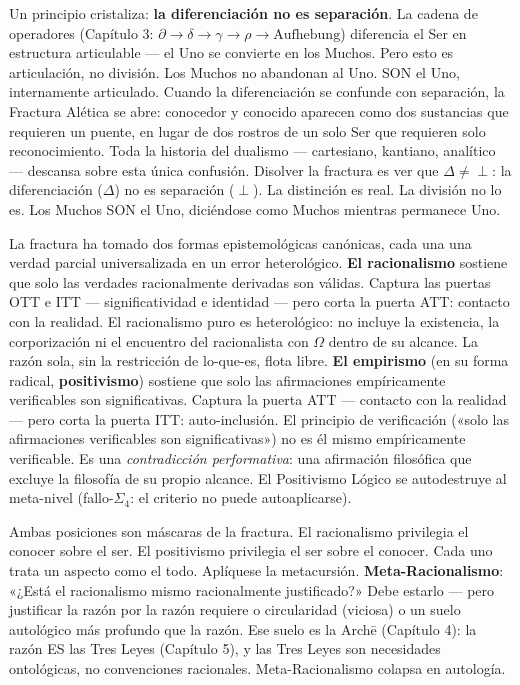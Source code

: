 \documentclass[10pt, openany, oneside]{book}
\begin{document}
Un principio cristaliza: \textbf{la diferenciación no es separación}. La cadena de operadores (Capítulo 3: $\partial \to \delta \to \gamma \to \rho \to \text{Aufhebung}$) diferencia el Ser en estructura articulable --- el Uno se convierte en los Muchos. Pero esto es articulación, no división. Los Muchos no abandonan al Uno. SON el Uno, internamente articulado. Cuando la diferenciación se confunde con separación, la Fractura Alética se abre: conocedor y conocido aparecen como dos sustancias que requieren un puente, en lugar de dos rostros de un solo Ser que requieren solo reconocimiento. Toda la historia del dualismo --- cartesiano, kantiano, analítico --- descansa sobre esta única confusión. Disolver la fractura es ver que $\Delta \neq \perp$: la diferenciación ($\Delta$) no es separación ($\perp$). La distinción es real. La división no lo es. Los Muchos SON el Uno, diciéndose como Muchos mientras permanece Uno.

La fractura ha tomado dos formas epistemológicas canónicas, cada una una verdad parcial universalizada en un error heterológico. \textbf{El racionalismo} sostiene que solo las verdades racionalmente derivadas son válidas. Captura las puertas OTT e ITT --- significatividad e identidad --- pero corta la puerta ATT: contacto con la realidad. El racionalismo puro es heterológico: no incluye la existencia, la corporización ni el encuentro del racionalista con $\Omega$ dentro de su alcance. La razón sola, sin la restricción de lo-que-es, flota libre. \textbf{El empirismo} (en su forma radical, \textbf{positivismo}) sostiene que solo las afirmaciones empíricamente verificables son significativas. Captura la puerta ATT --- contacto con la realidad --- pero corta la puerta ITT: auto-inclusión. El principio de verificación («solo las afirmaciones verificables son significativas») no es él mismo empíricamente verificable. Es una \textit{contradicción performativa}: una afirmación filosófica que excluye la filosofía de su propio alcance. El Positivismo Lógico se autodestruye al meta-nivel (fallo-$\Sigma_4$: el criterio no puede autoaplicarse).

Ambas posiciones son máscaras de la fractura. El racionalismo privilegia el conocer sobre el ser. El positivismo privilegia el ser sobre el conocer. Cada uno trata un aspecto como el todo. Aplíquese la metacursión. \textbf{Meta-Racionalismo}: «¿Está el racionalismo mismo racionalmente justificado?» Debe estarlo --- pero justificar la razón por la razón requiere o circularidad (viciosa) o un suelo autológico más profundo que la razón. Ese suelo es la Arch\={e} (Capítulo 4): la razón ES las Tres Leyes (Capítulo 5), y las Tres Leyes son necesidades ontológicas, no convenciones racionales. Meta-Racionalismo colapsa en autología.
\end{document}
